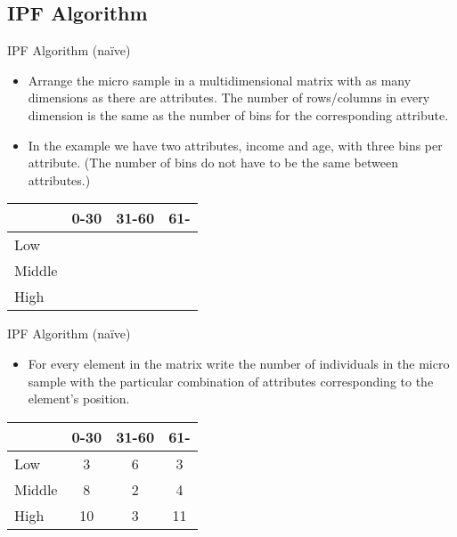 \documentclass{beamer}
\begin{document}
\subsection{IPF Algorithm}
\begin{frame}{IPF Algorithm (naïve)}
\begin{itemize}
\item Arrange the micro sample in a multidimensional matrix with as
  many dimensions as there are attributes. The number of rows/columns
  in every dimension is the same as the number of bins for the
  corresponding attribute.
\item In the example we have two attributes, income and age, with
  three bins per attribute. (The number of bins do not have to be the
  same between attributes.)
\end{itemize}

\begin{table}
\centering
\begin{tabular}{l||c c c}
      & 0-30 & 31-60 & 61-\\
\hline \hline
Low   & & & \\
Middle& & & \\
High  & & & \\
\end{tabular}
\end{table}
\end{frame}


\begin{frame}{IPF Algorithm (naïve)}
\begin{itemize}
\item For every element in the matrix write the number of individuals
  in the micro sample with the particular combination of attributes
  corresponding to the element's position.
\end{itemize}

\begin{table}
\centering
\begin{tabular}{l||c c c}
      & 0-30 & 31-60 & 61- \\
\hline \hline
Low   &  3 &  6 &  3 \\
Middle&  8 &  2 &  4 \\
High  & 10 &  3 & 11 \\
\end{tabular}
\end{table}
\end{frame}
\end{document}
